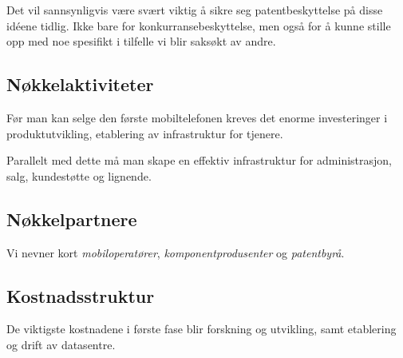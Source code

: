 Det vil sannsynligvis være svært viktig å sikre seg patentbeskyttelse på disse
idéene tidlig. Ikke bare for konkurransebeskyttelse, men også for å kunne
stille opp med noe spesifikt i tilfelle vi blir saksøkt av andre.

\subsection{Nøkkelaktiviteter}

Før man kan selge den første mobiltelefonen kreves det enorme investeringer i
produktutvikling, etablering av infrastruktur for tjenere.

Parallelt med dette må man skape en effektiv infrastruktur for administrasjon,
salg, kundestøtte og lignende.

\subsection{Nøkkelpartnere}

Vi nevner kort \textit{mobiloperatører}, \textit{komponentprodusenter} og
\textit{patentbyrå}.

\subsection{Kostnadsstruktur}

De viktigste kostnadene i første fase blir forskning og utvikling, samt
etablering og drift av datasentre.

